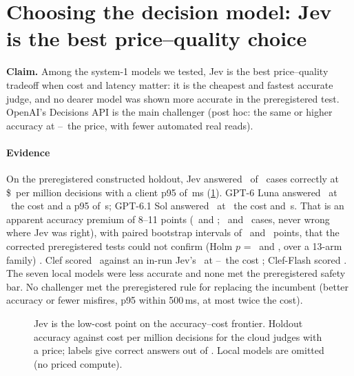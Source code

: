 \section{Choosing the decision model: Jev is the best price--quality choice}\label{sec:choose}

\textbf{Claim.} Among the system-1 models we tested, Jev is the best price--quality tradeoff when cost and latency
matter: it is the cheapest and fastest accurate judge, and no dearer model was shown more accurate in the preregistered
test. OpenAI's Decisions API is the main challenger (post hoc: the same or higher accuracy at
\OaPriceXLo--\OaPriceXHi\X\ the price, with fewer automated real reads).

\paragraph{Evidence} On the preregistered constructed holdout, Jev answered \JevHoldAccK\ of \HoldN\ cases correctly at
\$\JevHoldCost\ per million decisions with a client p95 of \JevHoldPninetyfiveRange\,ms (\cref{fig:frontier}). GPT-6
Luna answered \LunaHoldAccK\ at \LunaHoldCostX\X\ the cost and a p95 of \LunaHoldPninetyfiveRangeS\,s; GPT-6.1 Sol
answered \SolHoldAccK\ at \SolHoldCostX\X\ the cost and \SolHoldPninetyfiveRangeS\,s. That is an apparent accuracy
premium of 8--11 points (\LunaHoldRAccDiff\ and \SolHoldRAccDiff; \LunaHoldRAccCandOnly\ and \SolHoldRAccCandOnly\ cases,
never wrong where Jev was right), with paired bootstrap intervals of \LunaHoldRAccDiffCI\ and \SolHoldRAccDiffCI\ points,
that the corrected preregistered tests could not confirm (Holm $p$ = \LunaHoldRAccPHolm\ and \SolHoldRAccPHolm, over a
13-arm family) \prereg. Clef scored \ClHoldClefAcc\ against an in-run Jev's \ClHoldJevAcc\ at
\ClClefCostXLow--\ClClefCostXHigh\X\ the cost \posthoc; Clef-Flash scored \ClHoldFlashAcc. The seven local models were
less accurate and none met the preregistered safety bar. No challenger met the preregistered rule for replacing the
incumbent (better accuracy or fewer misfires, p95 within 500\,ms, at most twice the cost).

\begin{figure}[tbp]
\centering
{}\par\smallskip

\caption{Jev is the low-cost point on the accuracy--cost frontier. Holdout accuracy against cost per million
decisions for the cloud judges with a price; labels give correct answers out of \HoldN. Local models are omitted (no
priced compute).}
\label{fig:frontier}
\end{figure}

